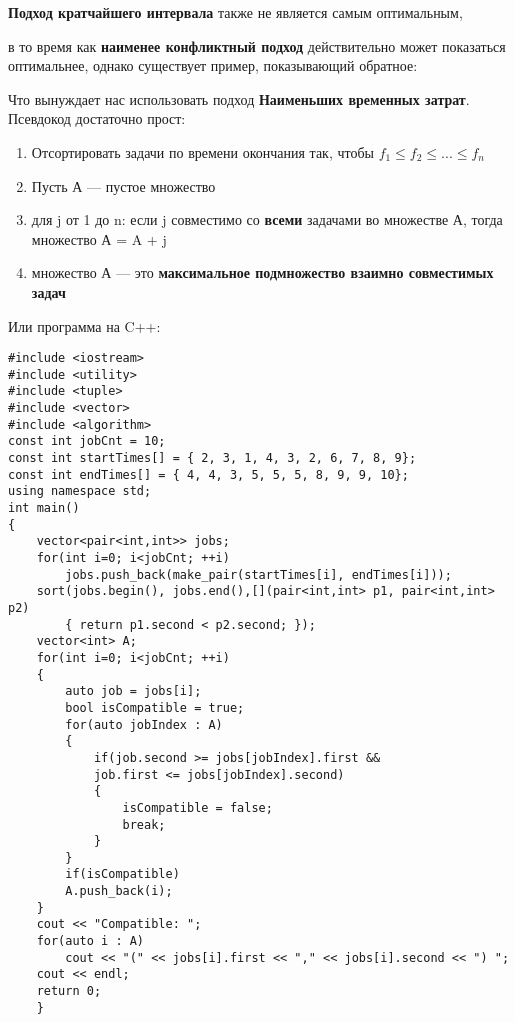 \vspace{\baselineskip}

\vspace{\baselineskip}
\textbf{Подход кратчайшего интервала } также не является самым оптимальным,

\vspace{\baselineskip}

\vspace{\baselineskip}
в то время как \textbf{наименее конфликтный подход} действительно может показаться оптимальнее, однако существует пример, показывающий обратное:

\vspace{\baselineskip}

\vspace{\baselineskip}
Что вынуждает нас использовать подход \textbf{Наименьших временных затрат}. Псевдокод достаточно прост:

\vspace{\baselineskip}
\begin{enumerate} 
    \item Отсортировать задачи по времени окончания так, чтобы $f_1 \le f_2 \le ... \le f_n$
    \item Пусть А --- пустое множество
    \item для j от 1 до n: если j совместимо со \textbf{всеми} задачами во множестве А, тогда множество А = A + {j}
     \item множество А --- это \textbf{максимальное подмножество взаимно совместимых задач}
\end{enumerate}

\vspace{\baselineskip}
Или программа на C++:

\vspace{\baselineskip}
\begin{tcolorbox}
\begin{verbatim}
#include <iostream>
#include <utility>
#include <tuple>
#include <vector>
#include <algorithm>
const int jobCnt = 10;
const int startTimes[] = { 2, 3, 1, 4, 3, 2, 6, 7, 8, 9};
const int endTimes[] = { 4, 4, 3, 5, 5, 5, 8, 9, 9, 10};
using namespace std;
int main()
{
	vector<pair<int,int>> jobs;
	for(int i=0; i<jobCnt; ++i)
		jobs.push_back(make_pair(startTimes[i], endTimes[i]));
	sort(jobs.begin(), jobs.end(),[](pair<int,int> p1, pair<int,int> p2)
		{ return p1.second < p2.second; });
	vector<int> A;
	for(int i=0; i<jobCnt; ++i)
	{
		auto job = jobs[i];
		bool isCompatible = true;
		for(auto jobIndex : A)
		{
			if(job.second >= jobs[jobIndex].first &&
			job.first <= jobs[jobIndex].second)
			{
				isCompatible = false;
				break;
			}
		}
		if(isCompatible)
		A.push_back(i);
	}
	cout << "Compatible: ";
	for(auto i : A)
		cout << "(" << jobs[i].first << "," << jobs[i].second << ") ";
	cout << endl;
	return 0;
	}
\end{verbatim}
\end{tcolorbox}

